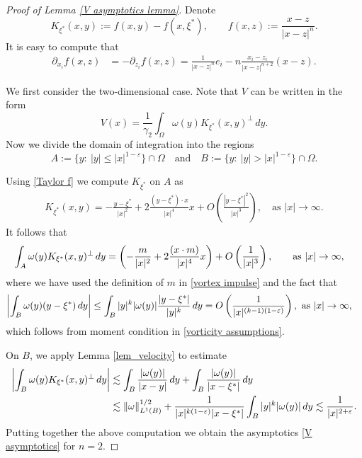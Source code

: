 \documentclass[11pt,reqno]{amsart}
\theoremstyle{plain}
\theoremstyle{remark}
\numberwithin{equation}{section}
\begin{document}
\begin{proof}[Proof of Lemma \ref{V asymptotics lemma}] Denote 
  \begin{equation}
    \label{K and f} K_{\xi^*}(x,y) := f(x,y) - f(x, \xi^*), \qquad f(x,z) := \frac{x -z}{|x-z|^n}.
  \end{equation}
It is easy to compute that 
\begin{equation}\label{Taylor f}
\begin{split}
\partial_{x_i} f(x,z) & = -\partial_{z_i} f(x,z) = \frac{1}{|x-z|^n} e_i - n \frac{x_i - z_i}{|x-z|^{n+2}} (x-z). 
\end{split}
\end{equation}

We first consider the two-dimensional case. Note that $V$ can be written in the form 
\[ V(x) = \frac{1}{\gamma_2} \int_\Omega \omega(y) K_{\xi^*}(x,y)^\perp \, dy.\]
Now we divide the domain of integration into  the regions 
\[ A := \{y: \ |y| \le |x|^{1-\varepsilon} \} \cap \Omega \quad \textrm{and} \quad B := \{ y: \ |y| > |x|^{1-\varepsilon} \} \cap \Omega.\]

Using \eqref{Taylor f} we compute $K_{\xi^*}$ on $A$ as
\begin{align}
K_{\xi^*}(x,y) = -\frac{y-\xi^*}{|x|^2} + 2 \frac{(y-\xi^*) \cdot x}{|x|^4} x + O\left( \frac{|y - \xi^*|^2}{|x|^3} \right), \quad \text{as } |x| \to \infty. \label{leading order K 2-d}
\end{align}
It follows that 
\begin{align*}
 \int_A \omega(y) K_{\xi^*}(x,y)^\perp \, dy
& = \left( -{m\over |x|^2} + 2{(x\cdot m) \over |x|^{4}} x \right) + O\left( {1\over |x|^{3}} \right), \qquad \textrm{as } |x| \to \infty,
\end{align*}
where we have used the definition of $m$ in \eqref{vortex impulse} and the fact that
\begin{align*}
\left| \int_B \omega(y) (y-\xi^*)  \, dy \right| & \leq \int_B |y|^k |\omega(y)| { |y-\xi^*| \over |y|^k }  \, dy  = O \left( {1\over |x|^{(k-1)(1-\varepsilon)}} \right), \text{ as } |x| \to \infty,
\end{align*}
which follows from moment condition in \eqref{vorticity assumptions}.

On $B$, we apply Lemma \ref{lem_velocity} to estimate 
\begin{align*}
\left| \int_B \omega(y) K_{\xi^*}(x,y)^\perp \, dy \right| & \lesssim \int_B {|\omega(y)| \over |x - y|} \, dy + \int_B {|\omega(y)| \over |x - \xi^*|} \, dy \\
& \lesssim \| \omega \|_{L^1(B)}^{1/2} + {1\over |x|^{k(1-\varepsilon)} |x - \xi^*|} \int_{B} |y|^k|\omega(y)| \, dy \lesssim {1\over |x|^{2+\varepsilon}}.
\end{align*}
Putting together the above computation we obtain the asymptotics \eqref{V asymptotics} for $n=2$.


\end{proof}
\end{document}
